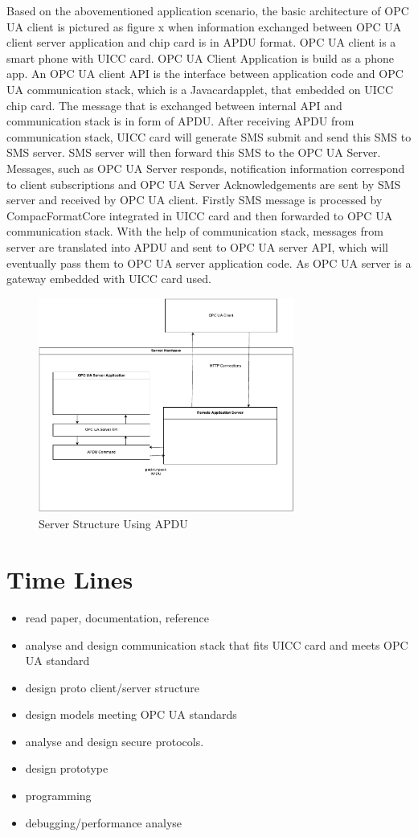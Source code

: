 \documentclass[]{llncs}
\begin{document}
Based on the abovementioned application scenario, the basic architecture of OPC UA client is pictured as figure x when information exchanged between OPC UA client server application and chip card is in APDU format. OPC UA client is a smart phone with UICC card. OPC UA Client Application is build as a phone app. An OPC UA client API is the interface between application code and OPC UA communication stack, which is a Javacardapplet, that embedded on UICC chip card. The message that is exchanged between internal API and communication stack is in form of APDU. After receiving APDU from communication stack, UICC card will generate SMS submit and send this SMS to SMS server. SMS server will then forward this SMS to the OPC UA Server. Messages, such as OPC UA Server responds, notification information correspond to client subscriptions and OPC UA Server Acknowledgements are sent by SMS server and received by OPC UA client. Firstly SMS message is processed by CompacFormatCore integrated in UICC card and then forwarded to OPC UA communication stack. With the help of communication stack, messages from server are translated into APDU and sent to OPC UA server API, which will eventually pass them to OPC UA server application code. As OPC UA server is a gateway embedded with UICC card used.
 \begin{figure}
	\centering
	\includegraphics[width=0.75\textwidth]{serverStructure}
		\caption[ ]{Server Structure Using APDU}
	\label{fig:serverStructure}
\end{figure}

\section{Time Lines}
\begin{itemize}
  \item read paper, documentation, reference
  \item analyse and design communication stack that fits UICC card and meets OPC UA standard 
  \item design proto client/server structure 
  \item design models meeting OPC UA standards 
  \item analyse and design secure protocols. 
  \item design prototype
  \item programming
  \item debugging/performance analyse
\end{itemize}



\end{document}
